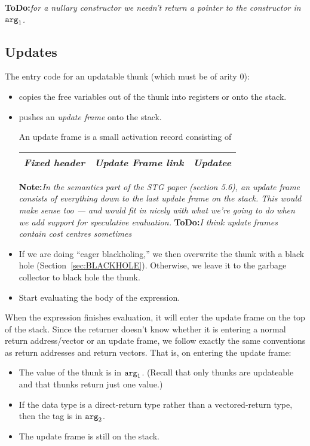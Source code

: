 \documentclass[11pt]{article}
\newcommand{\note}[1]{{{\bf Note:}\sl #1}}
\newcommand{\ToDo}[1]{{{\bf ToDo:}\sl #1}}
\newcommand{\Arg}[1]{\mbox{${\tt arg}_{#1}$}}
\newcommand{\secref}[1]{Section~\ref{sec:#1}}
\newcommand{\Subsection}[2]{\subsection{#1}\label{sec:#2}}
\begin{document}
\ToDo{for a nullary constructor we needn't return a pointer to the
constructor in \Arg{1}.}

\Subsection{Updates}{data-updates}

The entry code for an updatable thunk (which must be of arity 0):

\begin{itemize}
\item copies the free variables out of the thunk into registers or
  onto the stack.
\item pushes an \emph{update frame} onto the stack.

An update frame is a small activation record consisting of
\begin{center}
\begin{tabular}{|l|l|l|}
\hline
\emph{Fixed header} & \emph{Update Frame link} & \emph{Updatee} \\
\hline
\end{tabular}
\end{center}

\note{In the semantics part of the STG paper (section 5.6), an update
frame consists of everything down to the last update frame on the
stack.  This would make sense too --- and would fit in nicely with
what we're going to do when we add support for speculative
evaluation.}
\ToDo{I think update frames contain cost centres sometimes}

\item If we are doing ``eager blackholing,'' we then overwrite the
thunk with a black hole (\secref{BLACKHOLE}).  Otherwise, we leave it
to the garbage collector to black hole the thunk.

\item 
Start evaluating the body of the expression.

\end{itemize}

When the expression finishes evaluation, it will enter the update
frame on the top of the stack.  Since the returner doesn't know
whether it is entering a normal return address/vector or an update
frame, we follow exactly the same conventions as return addresses and
return vectors.  That is, on entering the update frame:

\begin{itemize} 
\item The value of the thunk is in \Arg{1}.  (Recall that only thunks
are updateable and that thunks return just one value.)

\item If the data type is a direct-return type rather than a
vectored-return type, then the tag is in \Arg{2}.

\item The update frame is still on the stack.
\end{itemize}
\end{document}
